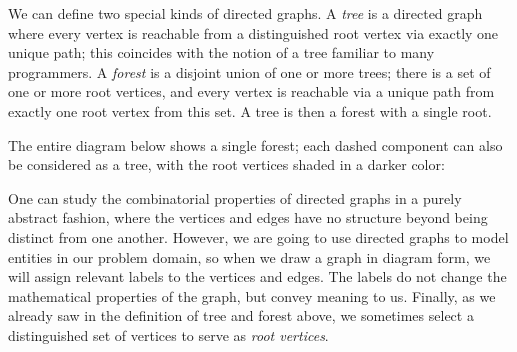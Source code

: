 \documentclass[../generics]{subfiles}
\begin{document}
\begin{definition} We can define two special kinds of directed graphs. A \emph{tree} is a directed graph where every vertex is reachable from a distinguished root vertex via exactly one unique path; this coincides with the notion of a tree familiar to many programmers. A \emph{forest} is a disjoint union of one or more trees; there is a set of one or more root vertices, and every vertex is reachable via a unique path from exactly one root vertex from this set. A tree is then a forest with a single root.
\end{definition}

The entire diagram below shows a single forest; each dashed component can also be considered as a tree, with the root vertices shaded in a darker color:
\begin{quote}
\end{quote}

One can study the combinatorial properties of directed graphs in a purely abstract fashion, where the vertices and edges have no structure beyond being distinct from one another. However, we are going to use directed graphs to model entities in our problem domain, so when we draw a graph in diagram form, we will assign relevant labels to the vertices and edges. The labels do not change the mathematical properties of the graph, but convey meaning to us. Finally, as we already saw in the definition of tree and forest above, we sometimes select a distinguished set of vertices to serve as \emph{root vertices}.
\end{document}
